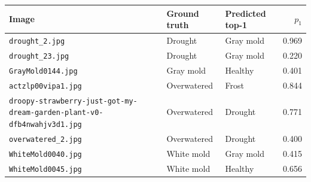 \begin{tabular}{lllr}
\toprule
Image & Ground truth & Predicted top-1 & $p_1$ \\
\midrule
\texttt{drought\_2.jpg} & Drought & Gray mold & 0.969 \\
\texttt{drought\_23.jpg} & Drought & Gray mold & 0.220 \\
\texttt{GrayMold0144.jpg} & Gray mold & Healthy & 0.401 \\
\texttt{actzlp00vipa1.jpg} & Overwatered & Frost & 0.844 \\
\texttt{droopy-strawberry-just-got-my-dream-garden-plant-v0-dfb4nwahjv3d1.jpg} & Overwatered & Drought & 0.771 \\
\texttt{overwatered\_2.jpg} & Overwatered & Drought & 0.400 \\
\texttt{WhiteMold0040.jpg} & White mold & Gray mold & 0.415 \\
\texttt{WhiteMold0045.jpg} & White mold & Healthy & 0.656 \\
\bottomrule
\end{tabular}
